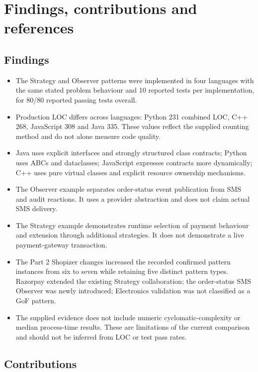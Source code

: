 \documentclass[11pt,a4paper]{article}
\begin{document}
\section{Findings, contributions and references}

\subsection*{Findings}
\begin{itemize}
  \item The Strategy and Observer patterns were implemented in four languages with the same stated problem behaviour and 10 reported tests per implementation, for 80/80 reported passing tests overall.
  \item Production LOC differs across languages: Python 231 combined LOC, C++ 268, JavaScript 308 and Java 335. These values reflect the supplied counting method and do not alone measure code quality.
  \item Java uses explicit interfaces and strongly structured class contracts; Python uses ABCs and dataclasses; JavaScript expresses contracts more dynamically; C++ uses pure virtual classes and explicit resource ownership mechanisms.
  \item The Observer example separates order-status event publication from SMS and audit reactions. It uses a provider abstraction and does not claim actual SMS delivery.
  \item The Strategy example demonstrates runtime selection of payment behaviour and extension through additional strategies. It does not demonstrate a live payment-gateway transaction.
  \item The Part 2 Shopizer changes increased the recorded confirmed pattern instances from six to seven while retaining five distinct pattern types. Razorpay extended the existing Strategy collaboration; the order-status SMS Observer was newly introduced; Electronics validation was not classified as a GoF pattern.
  \item The supplied evidence does not include numeric cyclomatic-complexity or median process-time results. These are limitations of the current comparison and should not be inferred from LOC or test pass rates.
\end{itemize}

\subsection*{Contributions}
\end{document}
